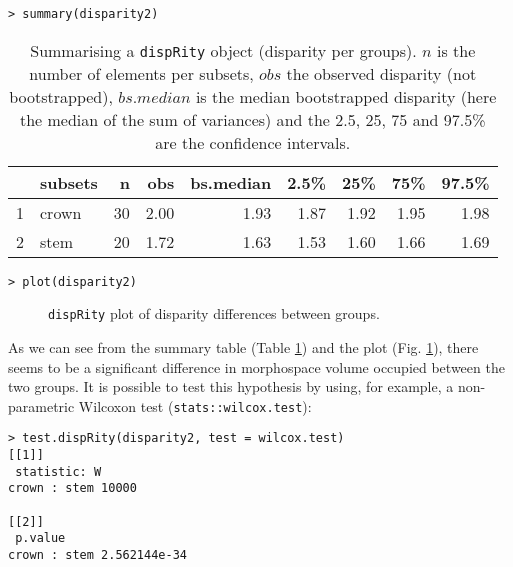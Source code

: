 \documentclass[12pt,letterpaper]{article}
\newcommand{\disp}{\texttt{dispRity} }
\begin{document}
\noindent \texttt{> summary(disparity2)}

\begin{table}[ht]
\centering
\begin{tabular}{rlrrrrrrr}
  \hline
 & subsets & n & obs & bs.median & 2.5\% & 25\% & 75\% & 97.5\% \\ 
  \hline
1 & crown &  30 & 2.00 & 1.93 & 1.87 & 1.92 & 1.95 & 1.98 \\ 
  2 & stem &  20 & 1.72 & 1.63 & 1.53 & 1.60 & 1.66 & 1.69 \\ 
   \hline
\end{tabular}
\caption{Summarising a \disp object (disparity per groups). $n$ is the number of elements per subsets, $obs$ the observed disparity (not bootstrapped), $bs.median$ is the median bootstrapped disparity (here the median of the sum of variances) and the 2.5, 25, 75 and 97.5\% are the confidence intervals.}
\label{Tab:summary_group}
\end{table}

\noindent \texttt{> plot(disparity2)}

\begin{figure}[!htbp]
\centering
\caption{\disp plot of disparity differences between groups.}
\label{Fig:plot_group}
\end{figure}

As we can see from the summary table (Table \ref{Tab:summary_group}) and the plot (Fig. \ref{Fig:plot_group}), there seems to be a significant difference in morphospace volume occupied between the two groups.
It is possible to test this hypothesis by using, for example, a non-parametric Wilcoxon test (\texttt{stats::wilcox.test}):

\noindent \texttt{> test.dispRity(disparity2, test = wilcox.test)}\\

\noindent \texttt{[[1]]}\\
\noindent \texttt{          statistic: W}\\
\noindent \texttt{crown : stem     10000}\\
\noindent \texttt{ }\\
\noindent \texttt{[[2]]}\\
\noindent \texttt{                  p.value}\\
\noindent \texttt{crown : stem 2.562144e-34}\\
\end{document}
